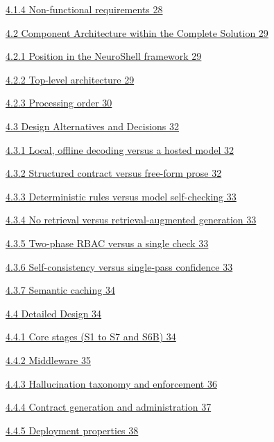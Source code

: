 \documentclass[
]{article}
\begin{document}
\protect\hyperlink{non-functional-requirements}{4.1.4 Non-functional
requirements 28}

\protect\hyperlink{component-architecture-within-the-complete-solution}{4.2
Component Architecture within the Complete Solution 29}

\protect\hyperlink{position-in-the-neuroshell-framework}{4.2.1 Position
in the NeuroShell framework 29}

\protect\hyperlink{top-level-architecture}{4.2.2 Top-level architecture
29}

\protect\hyperlink{processing-order}{4.2.3 Processing order 30}

\protect\hyperlink{design-alternatives-and-decisions}{4.3 Design
Alternatives and Decisions 32}

\protect\hyperlink{local-offline-decoding-versus-a-hosted-model}{4.3.1
Local, offline decoding versus a hosted model 32}

\protect\hyperlink{structured-contract-versus-free-form-prose}{4.3.2
Structured contract versus free-form prose 32}

\protect\hyperlink{deterministic-rules-versus-model-self-checking}{4.3.3
Deterministic rules versus model self-checking 33}

\protect\hyperlink{no-retrieval-versus-retrieval-augmented-generation}{4.3.4
No retrieval versus retrieval-augmented generation 33}

\protect\hyperlink{two-phase-rbac-versus-a-single-check}{4.3.5 Two-phase
RBAC versus a single check 33}

\protect\hyperlink{self-consistency-versus-single-pass-confidence}{4.3.6
Self-consistency versus single-pass confidence 33}

\protect\hyperlink{semantic-caching}{4.3.7 Semantic caching 34}

\protect\hyperlink{detailed-design}{4.4 Detailed Design 34}

\protect\hyperlink{core-stages-s1-to-s7-and-s6b}{4.4.1 Core stages (S1
to S7 and S6B) 34}

\protect\hyperlink{middleware}{4.4.2 Middleware 35}

\protect\hyperlink{hallucination-taxonomy-and-enforcement}{4.4.3
Hallucination taxonomy and enforcement 36}

\protect\hyperlink{contract-generation-and-administration}{4.4.4
Contract generation and administration 37}

\protect\hyperlink{deployment-properties}{4.4.5 Deployment properties
38}
\end{document}
